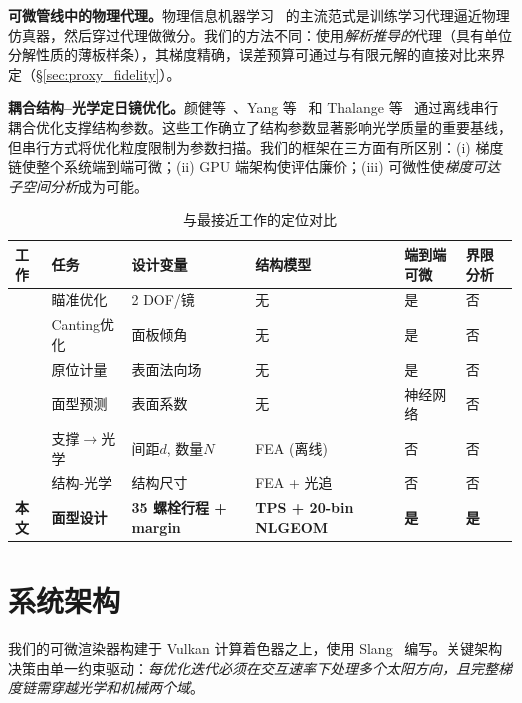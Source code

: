 \documentclass[12pt,a4paper]{ctexart}
\begin{document}
\textbf{可微管线中的物理代理。}物理信息机器学习~\cite{karniadakis2021} 的主流范式是训练学习代理逼近物理仿真器，然后穿过代理做微分。我们的方法不同：使用\emph{解析推导的}代理（具有单位分解性质的薄板样条），其梯度精确，误差预算可通过与有限元解的直接对比来界定（\S\ref{sec:proxy_fidelity}）。

\textbf{耦合结构--光学定日镜优化。}颜健等~\cite{yan2024,yan2025}、Yang 等~\cite{yang2022} 和 Thalange 等~\cite{thalange2017} 通过离线串行耦合优化支撑结构参数。这些工作确立了结构参数显著影响光学质量的重要基线，但串行方式将优化粒度限制为参数扫描。我们的框架在三方面有所区别：(i) 梯度链使整个系统端到端可微；(ii) GPU 端架构使评估廉价；(iii) 可微性使\emph{梯度可达子空间分析}成为可能。

\begin{table}[t]
\centering
\caption{与最接近工作的定位对比}
\label{tab:positioning}
\small
\begin{tabular}{lp{2.0cm}p{2.5cm}p{2.0cm}p{1.4cm}p{1.6cm}}
\toprule
工作 & 任务 & 设计变量 & 结构模型 & 端到端可微 & 界限分析 \\
\midrule
\cite{aiming2025} & 瞄准优化 & 2 DOF/镜 & 无 & 是 & 否 \\
\cite{canting2025} & Canting优化 & 面板倾角 & 无 & 是 & 否 \\
\cite{pargmann2024} & 原位计量 & 表面法向场 & 无 & 是 & 否 \\
\cite{inverse2025a, inverse2025b} & 面型预测 & 表面系数 & 无 & 神经网络 & 否 \\
\cite{yan2024,yan2025} & 支撑$\to$光学 & 间距$d$, 数量$N$ & FEA (离线) & 否 & 否 \\
\cite{yang2022,thalange2017} & 结构-光学 & 结构尺寸 & FEA + 光追 & 否 & 否 \\
\midrule
\textbf{本文} & \textbf{面型设计} & \textbf{35 螺栓行程 + margin} & \textbf{TPS + 20-bin NLGEOM} & \textbf{是} & \textbf{是} \\
\bottomrule
\end{tabular}
\end{table}

\section{系统架构}
\label{sec:system}

我们的可微渲染器构建于 Vulkan 计算着色器之上，使用 Slang~\cite{slang} 编写。关键架构决策由单一约束驱动：\emph{每优化迭代必须在交互速率下处理多个太阳方向，且完整梯度链需穿越光学和机械两个域}。
\end{document}
